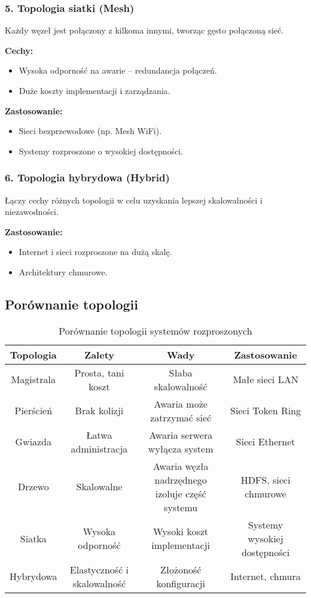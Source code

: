 \subsubsection{5. Topologia siatki (Mesh)}
Każdy węzeł jest połączony z kilkoma innymi, tworząc gęsto połączoną sieć.

\textbf{Cechy:}
\begin{itemize}
    \item Wysoka odporność na awarie – redundancja połączeń.
    \item Duże koszty implementacji i zarządzania.
\end{itemize}

\textbf{Zastosowanie:}
\begin{itemize}
    \item Sieci bezprzewodowe (np. Mesh WiFi).
    \item Systemy rozproszone o wysokiej dostępności.
\end{itemize}

\subsubsection{6. Topologia hybrydowa (Hybrid)}
Łączy cechy różnych topologii w celu uzyskania lepszej skalowalności i niezawodności.

\textbf{Zastosowanie:}
\begin{itemize}
    \item Internet i sieci rozproszone na dużą skalę.
    \item Architektury chmurowe.
\end{itemize}

\subsection{Porównanie topologii}

\begin{table}[h]
    \centering
    \renewcommand{\arraystretch}{1.3}
    \begin{tabular}{|c|c|c|c|}
        \hline
        \textbf{Topologia} & \textbf{Zalety} & \textbf{Wady} & \textbf{Zastosowanie} \\
        \hline
        Magistrala & Prosta, tani koszt & Słaba skalowalność & Małe sieci LAN \\
        \hline
        Pierścień & Brak kolizji & Awaria może zatrzymać sieć & Sieci Token Ring \\
        \hline
        Gwiazda & Łatwa administracja & Awaria serwera wyłącza system & Sieci Ethernet \\
        \hline
        Drzewo & Skalowalne & Awaria węzła nadrzędnego izoluje część systemu & HDFS, sieci chmurowe \\
        \hline
        Siatka & Wysoka odporność & Wysoki koszt implementacji & Systemy wysokiej dostępności \\
        \hline
        Hybrydowa & Elastyczność i skalowalność & Złożoność konfiguracji & Internet, chmura \\
        \hline
    \end{tabular}
    \caption{Porównanie topologii systemów rozproszonych}
\end{table}

